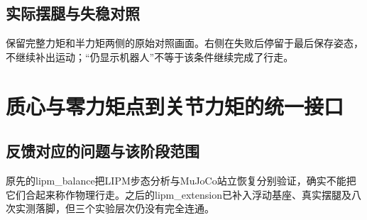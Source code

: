 \subsection{实际摆腿与失稳对照}
保留完整力矩和半力矩两侧的原始对照画面。右侧在失败后停留于最后保存姿态，不继续补出运动；“仍显示机器人”不等于该条件继续完成了行走。



\FloatBarrier

\section{质心与零力矩点到关节力矩的统一接口}

\label{stage:s22}

\subsection{反馈对应的问题与该阶段范围}\label{s22-detail-1}

原先的lipm\_balance把LIPM步态分析与MuJoCo站立恢复分别验证，确实不能把它们合起来称作物理行走。之后的lipm\_extension已补入浮动基座、真实摆腿及八次实测落脚，但三个实验层次仍没有完全连通。

